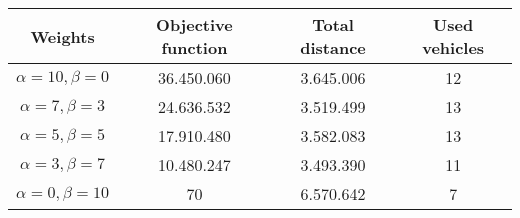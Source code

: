 {
\renewcommand{\arraystretch}{2}
\begin{longtable}[h]{| c | c | c | c |}
    \hline
    \textbf{Weights} & \textbf{Objective function} & \textbf{Total distance} & \textbf{Used vehicles} \\
    \hline
    \endhead
    $\alpha = 10, \beta = 0$ & 36.450.060 & 3.645.006 & 12 \\
    \hline
    $\alpha = 7, \beta = 3$  & 24.636.532 & 3.519.499 & 13 \\
    \hline
    $\alpha = 5, \beta = 5$  & 17.910.480 & 3.582.083 & 13 \\
    \hline
    $\alpha = 3, \beta = 7$  & 10.480.247 & 3.493.390 & 11 \\
    \hline
    $\alpha = 0, \beta = 10$ &         70 & 6.570.642 &  7 \\
    \hline
\end{longtable}
}